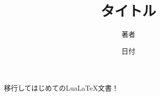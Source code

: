 \documentclass[a4paper]{ltjsarticle}
\title{タイトル}
\author{著者}
\date{日付}
\begin{document}
\maketitle

移行してはじめてのLua\LaTeX{}文書！
\end{document}
